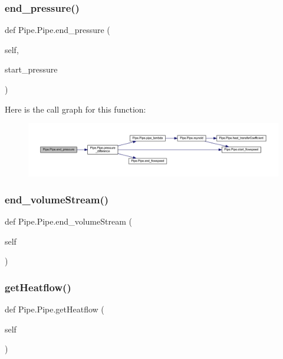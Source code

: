 \subsubsection{\texorpdfstring{end\+\_\+pressure()}{end\_pressure()}}
{\footnotesize\ttfamily def Pipe.\+Pipe.\+end\+\_\+pressure (\begin{DoxyParamCaption}\item[{}]{self,  }\item[{}]{start\+\_\+pressure }\end{DoxyParamCaption})}

Here is the call graph for this function\+:
\nopagebreak
\begin{figure}[H]
\begin{center}
\leavevmode
\includegraphics[width=350pt]{class_pipe_1_1_pipe_a93aa9c0dd790f2014d2c403b23164646_cgraph}
\end{center}
\end{figure}
\mbox{\label{class_pipe_1_1_pipe_ae2b6ac79c8416e15bb8846739e90d0f6}} 
\subsubsection{\texorpdfstring{end\+\_\+volume\+Stream()}{end\_volumeStream()}}
{\footnotesize\ttfamily def Pipe.\+Pipe.\+end\+\_\+volume\+Stream (\begin{DoxyParamCaption}\item[{}]{self }\end{DoxyParamCaption})}

\mbox{\label{class_pipe_1_1_pipe_afbd372f6badcea91558e723eb0c81712}} 
\subsubsection{\texorpdfstring{get\+Heatflow()}{getHeatflow()}}
{\footnotesize\ttfamily def Pipe.\+Pipe.\+get\+Heatflow (\begin{DoxyParamCaption}\item[{}]{self }\end{DoxyParamCaption})}


